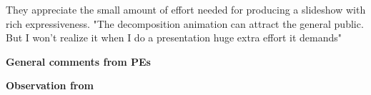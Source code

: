 They appreciate the small amount of effort needed for producing a slideshow with rich expressiveness. "The decomposition animation can attract the general public. But I won't realize it when I do a presentation huge extra effort it demands"



\noindent
\textbf{General comments from PEs}

\noindent
\textbf{Observation from }
